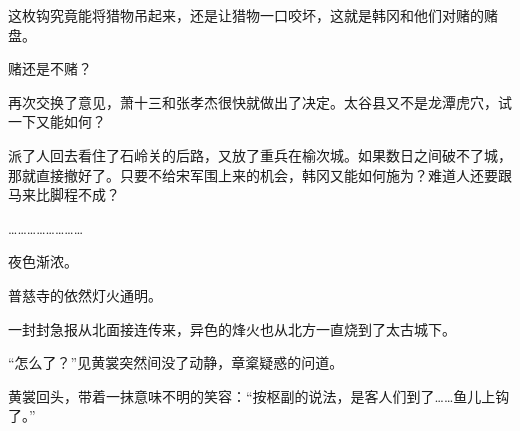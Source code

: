 这枚钩究竟能将猎物吊起来，还是让猎物一口咬坏，这就是韩冈和他们对赌的赌盘。

赌还是不赌？

再次交换了意见，萧十三和张孝杰很快就做出了决定。太谷县又不是龙潭虎穴，试一下又能如何？

派了人回去看住了石岭关的后路，又放了重兵在榆次城。如果数日之间破不了城，那就直接撤好了。只要不给宋军围上来的机会，韩冈又能如何施为？难道人还要跟马来比脚程不成？

……………………

夜色渐浓。

普慈寺的依然灯火通明。

一封封急报从北面接连传来，异色的烽火也从北方一直烧到了太古城下。

“怎么了？”见黄裳突然间没了动静，章楶疑惑的问道。

黄裳回头，带着一抹意味不明的笑容：“按枢副的说法，是客人们到了……鱼儿上钩了。”

